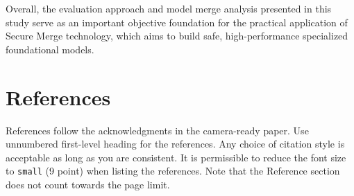 \documentclass{article}
\begin{document}
Overall, the evaluation approach and model merge analysis presented in this study serve as an important objective foundation for the practical application of Secure Merge technology, which aims to build safe, high-performance specialized foundational models.


\section*{References}


References follow the acknowledgments in the camera-ready paper. Use unnumbered first-level heading for
the references. Any choice of citation style is acceptable as long as you are
consistent. It is permissible to reduce the font size to \verb+small+ (9 point)
when listing the references.
Note that the Reference section does not count towards the page limit.
\medskip
\end{document}
